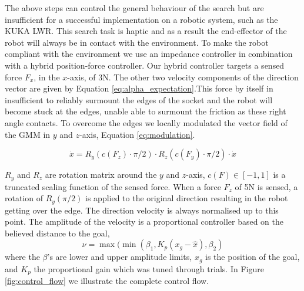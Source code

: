 The above steps can control the general behaviour of the search but are insufficient for a successful implementation on a robotic system, 
such as the KUKA LWR.
This search task is haptic and as a result the end-effector of the robot will always be in contact with the environment. To make the robot
compliant with the environment we use an impedance controller in combination with a hybrid position-force controller. Our hybrid controller
targets a sensed force $F_x$, in the $x$-axis, of 3N. The other two velocity components of the direction vector are given by 
Equation \ref{eq:alpha_expectation}.This force by itself in insufficient to reliably surmount the edges of the socket and the robot 
will become stuck at the edges, unable able to surmount the friction as these right angle contacts. To overcome the edges we locally modulated 
the vector field of the GMM in $y$ and $z$-axis, Equation \ref{eq:modulation}.

\begin{equation}
  \dot{x} = R_y(c(F_z) \cdot \pi/2) \cdot R_z(c(F_y) \cdot \pi/2) \cdot \dot{x} \label{eq:modulation}
\end{equation}

$R_y$ and $R_z$ are rotation matrix around the $y$ and $z$-axis, $c(F) \in [-1,1]$ is a truncated scaling function of the sensed 
force.  When a force $F_z$ of 5N is sensed, a rotation of $R_y(\pi/2)$ is applied to the original direction resulting in the robot
getting over the edge. The direction velocity is always normalised up to this point. The amplitude of the velocity is a proportional
controller based on the believed distance to the goal,
\begin{equation}
  \nu = \max(\min(\beta_1,K_p (x_g - \hat{x}),\beta_2)\label{eq:prop_speed}
\end{equation}
where the $\beta$'s are lower and upper amplitude limits, $x_g$ is the position of the
goal, and $K_p$ the proportional gain which was tuned through trials. In Figure \ref{fig:control_flow}
we illustrate the complete control flow.

